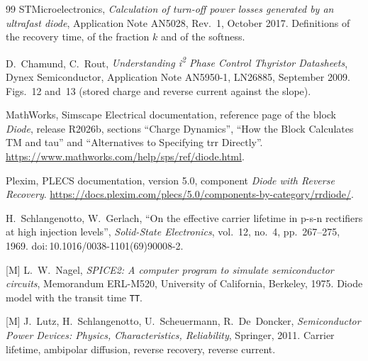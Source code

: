 \documentclass[10pt,a4paper]{scrartcl}
\begin{document}
\begin{thebibliography}{99}
STMicroelectronics, \emph{Calculation of turn-off power losses generated by an ultrafast diode}, Application Note AN5028, Rev.~1, October 2017. Definitions of the recovery time, of the fraction $k$ and of the softness.

D.~Chamund, C.~Rout, \emph{Understanding i\textsuperscript{2} Phase Control Thyristor Datasheets}, Dynex Semiconductor, Application Note AN5950-1, LN26885, September 2009. Figs.~12 and~13 (stored charge and reverse current against the slope).

MathWorks, Simscape Electrical documentation, reference page of the block \emph{Diode}, release R2026b, sections ``Charge Dynamics'', ``How the Block Calculates TM and tau'' and ``Alternatives to Specifying trr Directly''. \url{https://www.mathworks.com/help/sps/ref/diode.html}.

Plexim, PLECS documentation, version 5.0, component \emph{Diode with Reverse Recovery}. \url{https://docs.plexim.com/plecs/5.0/components-by-category/rrdiode/}.

H.~Schlangenotto, W.~Gerlach, ``On the effective carrier lifetime in p-s-n rectifiers at high injection levels'', \emph{Solid-State Electronics}, vol.~12, no.~4, pp.~267--275, 1969. doi:\,10.1016/0038-1101(69)90008-2.

[M] L.~W.~Nagel, \emph{SPICE2: A computer program to simulate semiconductor circuits}, Memorandum ERL-M520, University of California, Berkeley, 1975. Diode model with the transit time \texttt{TT}.

[M] J.~Lutz, H.~Schlangenotto, U.~Scheuermann, R.~De~Doncker, \emph{Semiconductor Power Devices: Physics, Characteristics, Reliability}, Springer, 2011. Carrier lifetime, ambipolar diffusion, reverse recovery, reverse current.

\end{thebibliography}
\end{document}
